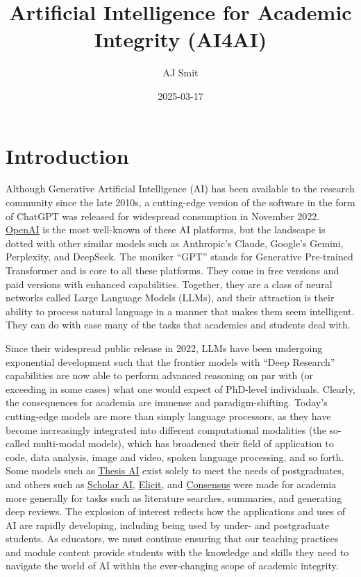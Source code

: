 \documentclass[
  10t,
]{article}
\title{Artificial Intelligence for Academic Integrity (AI4AI)}
\author{AJ Smit}
\date{2025-03-17}
\begin{document}
\maketitle


\section{Introduction}\label{introduction}

Although Generative Artificial Intelligence (AI) has been available to
the research community since the late 2010s, a cutting-edge version of
the software in the form of ChatGPT was released for widespread
consumption in November 2022. \href{https://chat.openai.com/}{OpenAI} is
the most well-known of these AI platforms, but the landscape is dotted
with other similar models such as Anthropic's Claude, Google's Gemini,
Perplexity, and DeepSeek. The moniker ``GPT'' stands for Generative
Pre-trained Transformer and is core to all these platforms. They come in
free versions and paid versions with enhanced capabilities. Together,
they are a class of neural networks called Large Language Models (LLMs),
and their attraction is their ability to process natural language in a
manner that makes them seem intelligent. They can do with ease many of
the tasks that academics and students deal with.

Since their widespread public release in 2022, LLMs have been undergoing
exponential development such that the frontier models with ``Deep
Research'' capabilities are now able to perform advanced reasoning on
par with (or exceeding in some cases) what one would expect of PhD-level
individuals. Clearly, the consequences for academia are immense and
paradigm-shifting. Today's cutting-edge models are more than simply
language processors, as they have become increasingly integrated into
different computational modalities (the so-called multi-modal models),
which has broadened their field of application to code, data analysis,
image and video, spoken language processing, and so forth. Some models
such as \href{https://www.thesisai.io}{Thesis AI} exist solely to meet
the needs of postgraduates, and others such as
\href{https://scholarai.io}{Scholar AI},
\href{https://elicit.com}{Elicit}, and
\href{https://consensus.app}{Consensus} were made for academia more
generally for tasks such as literature searches, summaries, and
generating deep reviews. The explosion of interest reflects how the
applications and uses of AI are rapidly developing, including being used
by under- and postgraduate students. As educators, we must continue
ensuring that our teaching practices and module content provide students
with the knowledge and skills they need to navigate the world of AI
within the ever-changing scope of academic integrity.
\end{document}
